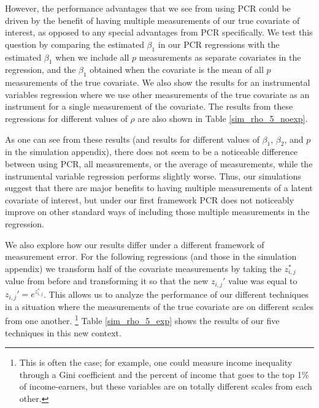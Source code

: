 \documentclass[10pt]{article}
\begin{document}
        However, the performance advantages that we see from using PCR could be driven by the benefit of having multiple measurements of our true covariate of interest, as opposed to any special advantages from PCR specifically. We test this question by comparing the estimated $\beta_1$ in our PCR regressions with the estimated $\beta_1$ when we include all $p$ measurements as separate covariates in the regression, and the $\beta_1$ obtained when the covariate is the mean of all $p$ measurements of the true covariate. We also show the results for an instrumental variables regression where we use other measurements of the true covariate as an instrument for a single measurement of the covariate. The results from these regressions for different values of $\rho$ are also shown in Table \ref{sim_rho_5_noexp}.

        As one can see from these results (and results for different values of $\beta_1$, $\beta_2$, and $p$ in the simulation appendix), there does not seem to be a noticeable difference between using PCR, all measurements, or the average of measurements, while the instrumental variable regression performs slightly worse. Thus, our simulations suggest that there are major benefits to having multiple measurements of a latent covariate of interest, but under our first framework PCR does not noticeably improve on other standard ways of including those multiple measurements in the regression.

        We also explore how our results differ under a different framework of measurement error. For the following regressions (and those in the simulation appendix) we transform half of the covariate measurements by taking the $z_{i,j}^*$ value from before and transforming it so that the new $z_{i,j}'$ value was equal to $z_{i,j}' = e^{z_{i,j}^*}$. This allows us to analyze the performance of our different techniques in a situation where the measurements of the true covariate are on different scales from one another. \footnote{This is often the case; for example, one could measure income inequality through a Gini coefficient and the percent of income that goes to the top 1\% of income-earners, but these variables are on totally different scales from each other.} Table \ref{sim_rho_5_exp} shows the results of our five techniques in this new context.
\end{document}
